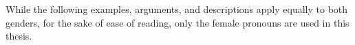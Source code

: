 While the following examples, arguments, and descriptions apply equally to both genders, for the sake of ease of reading, only the female pronouns are used in this thesis.
